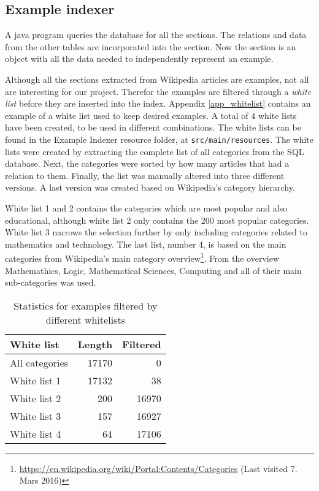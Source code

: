 \subsection{Example indexer}
A java program queries the database for all the sections. The relations and data from the other tables are incorporated into the section. Now the section is an object with all the data needed to independently represent an example.

Although all the sections extracted from Wikipedia articles are examples, not all are interesting for our project. Therefor the examples are filtered through a \textit{white list} before they are inserted into the index. Appendix \ref{app_whitelist} contains an example of a white list used to keep desired examples. A total of 4 white lists have been created, to be used in different combinations. The white lists can be found in the Example Indexer resource folder, at \texttt{src/main/resources}. The white lists were created by extracting the complete list of all categories from the SQL database. Next, the categories were sorted by how many articles that had a relation to them. Finally, the list was manually altered into three different versions. A last version was created based on Wikipedia's category hierarchy.

White list 1 and 2 contains the categories which are most popular and also educational, although white list 2 only contains the 200 most popular categories. White list 3 narrows the selection further by only including categories related to mathematics and technology. The last list, number 4, is based on the main categories from Wikipedia's main category overview\footnote{\url{https://en.wikipedia.org/wiki/Portal:Contents/Categories} (Last visited 7. Mars 2016)}. From the overview Mathemathics, Logic, Mathematical Sciences, Computing and all of their main sub-categories was used.

\begin{table}[h!]
\centering
\begin{tabular} {|| p{10em} | r | r||} 
 \hline
  White list & Length & Filtered \\ [0.5ex] 
 \hline
All categories & 17170 & 0 \\
White list 1 & 17132 & 38 \\
White list 2 & 200 & 16970 \\
White list 3 & 157 & 16927 \\
White list 4 & 64 & 17106 \\

 \hline
\end{tabular}
\caption{Statistics for examples filtered by different whitelists}
\label{table:whitelist_stats}
\end{table}

